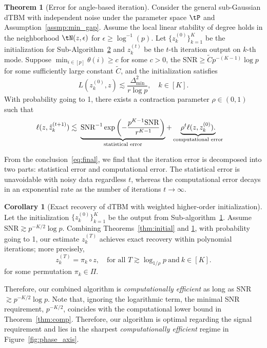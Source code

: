 \documentclass[lettersize,onecolumn,journal]{IEEEtran}
\theoremstyle{definition}
\newtheorem{thm}{Theorem}
\newtheorem{cor}{Corollary}
\theoremstyle{definition}
\newcommand{\of}[1]{\left(#1\right)}
\newcommand*{\KeepStyleUnderBrace}[1]{%
  \mathop{%
    \mathchoice
    {\underbrace{\displaystyle#1}}%
    {\underbrace{\textstyle#1}}%
    {\underbrace{\scriptstyle#1}}%
    {\underbrace{\scriptscriptstyle#1}}%
  }\limits
}
\def\fixme#1#2{\textbf{\color{red}[FIXME (#1): #2]}}
\begin{document}
{
\color{blue}


\begin{thm}[Error for angle-based iteration]\label{thm:refinement} Consider the general sub-Gaussian dTBM with independent noise under the parameter space $\tP$ and Assumption~\ref{assmp:min_gap}. Assume the local linear stability of degree holds in the neighborhood $\tN(z, \epsilon)$ for $\epsilon \geq \log^{-1}(p)$. Let $\{z^{(0)}_k\}_{k=1}^K$ be the initialization for Sub-Algorithm~\hyperref[alg:main]{2} and $z^{(t)}_k$ be the $t$-th iteration output on $k$-th mode. Suppose $\min_{i \in [p]}\theta(i) \geq c $ for some $c > 0$, the $\text{SNR} \geq \tilde C p^{-(K-1)}\log p$ for some sufficiently large constant $\tilde C$, and the initialization satisfies 
\begin{equation}
    L(z^{(0)}_k, z) \lesssim \frac{\Delta_{\min}^2}{r \log p}, \quad k \in [K].
\end{equation}
 With probability going to 1, there exists a contraction parameter $\rho \in (0,1)$ such that 
\begin{align}\label{eq:final}
    \ell(z, \hat z^{(t+1)}_k) \lesssim &\ \KeepStyleUnderBrace{
   \text{SNR}^{-1}
    \exp\of{- \frac{p^{K-1}\text{SNR}}{r^{K-1}}}}_{\substack{\text{statistical error}} }+ \KeepStyleUnderBrace{ \rho^t \ell(z, z^{(0)}_k). }_{\substack{\text{computational error}}}
\end{align}
\end{thm}
From the conclusion~\eqref{eq:final}, we find that the iteration error is decomposed into two parts: statistical error and computational error. The statistical error is unavoidable with noisy data regardless $t$, whereas the computational error decays in an exponential rate as the number of iterations $t \rightarrow \infty$. 


\begin{cor}[Exact recovery of dTBM with weighted higher-order initialization]  Let the initialization $\{z^{(0)}_k\}_{k = 1}^K$ be the output from Sub-algorithm~\hyperref[alg:main]{1}. Assume $\text{SNR} \gtrsim p^{-K/2} \log p$. Combining Theorems~\ref{thm:initial} and \ref{thm:refinement}, with probability going to 1, our estimate $z^{(T)}_k$ achieves exact recovery within polynomial iterations; more precisely,
\begin{equation}
     z^{(T)}_k = \pi_k \circ z, \quad \text{for all }T\gtrsim \log_{1/\rho} p\  \text{and}\ k \in [K ].
\end{equation}
for some permutation $\pi_k \in \Pi$. 
\end{cor}
Therefore, our combined algorithm is \textit{computationally efficient} as long as SNR $\gtrsim p^{-K/2} \log p$. Note that, ignoring the logarithmic term, the minimal SNR requirement, $p^{-K/2}$, coincides with the computational lower bound in Theorem~\ref{thm:comp}. Therefore, our algorithm is optimal regarding the signal requirement and lies in the sharpest \emph{computationally efficient} regime in Figure~\ref{fig:phase_axis}. 

}
\end{document}
